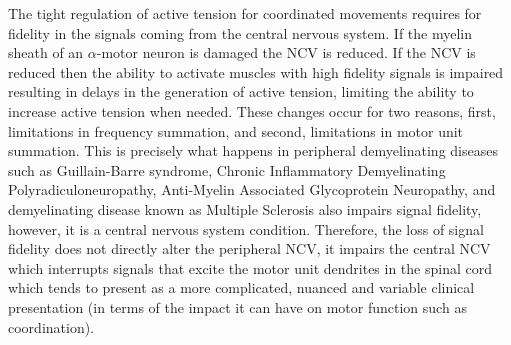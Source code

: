 The tight regulation of active tension for coordinated movements requires for fidelity in the signals coming from the central nervous system.\footnotemark{} If the myelin sheath of an $\alpha$-motor neuron is damaged the NCV is reduced. If the NCV is reduced then the ability to activate muscles with high fidelity signals is impaired resulting in delays in the generation of active tension, limiting the ability to increase active tension when needed. These changes occur for two reasons, first, limitations in frequency summation, and second, limitations in motor unit summation. This is precisely what happens in peripheral demyelinating diseases such as Guillain-Barre syndrome, Chronic Inflammatory Demyelinating Polyradiculoneuropathy, Anti-Myelin Associated Glycoprotein Neuropathy, and demyelinating disease known as Multiple Sclerosis also impairs signal fidelity, however, it is a central nervous system condition. Therefore, the loss of signal fidelity does not directly alter the peripheral NCV, it impairs the central NCV which interrupts signals that excite the motor unit dendrites in the spinal cord which tends to present as a more complicated, nuanced and variable clinical presentation (in terms of the impact it can have on motor function such as coordination).

\printbibliography[heading=subbibintoc]